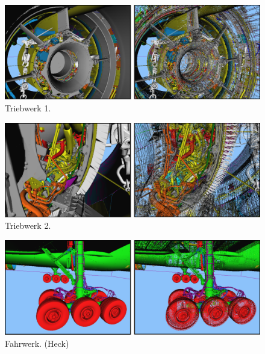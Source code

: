 \begin{figure}
\centering
\includegraphics[width=\hsize]{images/turbine_innen.pdf}
\caption{\label{fig:eval:turbine_innen}Triebwerk 1.}
\end{figure}
\vspace{0.9cm}
\begin{figure}
\centering
\includegraphics[width=\hsize]{images/turbine_innen2.pdf}
\caption{\label{fig:eval:turbine_innen2}Triebwerk 2.}
\end{figure}
\vspace{0.9cm}
\begin{figure}
\centering
\includegraphics[width=\hsize]{images/fahrwerk.pdf}
\caption{\label{fig:eval:fahrwerk}Fahrwerk. (Heck)}
\end{figure}

%
%

